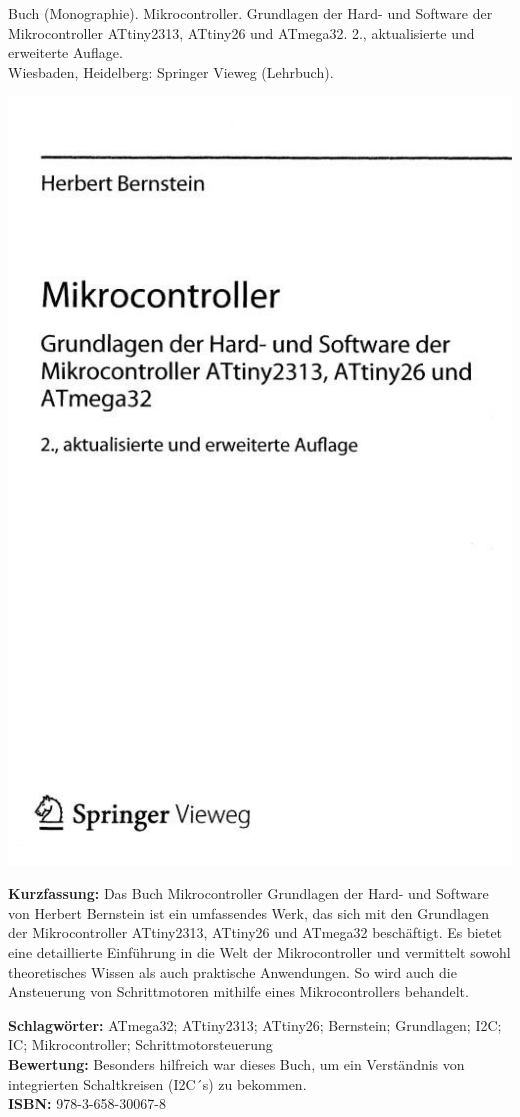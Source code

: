 {
Buch (Monographie). Mikrocontroller. Grundlagen der Hard- und Software der Mikrocontroller ATtiny2313, ATtiny26 und ATmega32.
2., aktualisierte und erweiterte Auflage.\\Wiesbaden, Heidelberg: Springer Vieweg (Lehrbuch). \\
\begin{minipage}{0.38\textwidth}
	\includegraphics[width=\linewidth]{images/Bernstein2.jpg}
\end{minipage}
\hfill
\begin{minipage}{0.6\textwidth}
\textbf{Kurzfassung:}
Das Buch \glqq Mikrocontroller Grundlagen der Hard- und Software \grqq von Herbert Bernstein ist ein umfassendes Werk, das sich mit den Grundlagen der Mikrocontroller ATtiny2313, ATtiny26 und ATmega32 beschäftigt. Es bietet eine detaillierte Einführung in die Welt der Mikrocontroller und vermittelt sowohl theoretisches Wissen als auch praktische Anwendungen. So wird auch die Ansteuerung von Schrittmotoren mithilfe eines Mikrocontrollers behandelt.		
\end{minipage}
\textbf{Schlagwörter:}
ATmega32; ATtiny2313; ATtiny26; Bernstein; Grundlagen; I2C; IC; Mikrocontroller; Schrittmotorsteuerung
\\ \textbf{Bewertung:}
Besonders hilfreich war dieses Buch, um ein Verständnis von integrierten Schaltkreisen (I2C´s)  zu bekommen.
\\ \textbf{ISBN:}
978-3-658-30067-8
}

